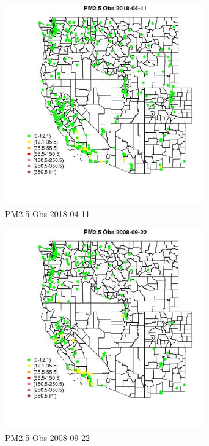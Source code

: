 \begin{figure} 
\centering  
\includegraphics[width=0.77\textwidth]{Code_Outputs/Report_ML_input_PM25_Step4_part_e_de_duplicated_aves_compiled_2019-05-18wNAs_MapObsPM25_Obs2018-04-11.jpg} 
\caption{\label{fig:Report_ML_input_PM25_Step4_part_e_de_duplicated_aves_compiled_2019-05-18wNAsMapObsPM25_Obs2018-04-11}PM2.5 Obs 2018-04-11} 
\end{figure} 
 

\begin{figure} 
\centering  
\includegraphics[width=0.77\textwidth]{Code_Outputs/Report_ML_input_PM25_Step4_part_e_de_duplicated_aves_compiled_2019-05-18wNAs_MapObsPM25_Obs2008-09-22.jpg} 
\caption{\label{fig:Report_ML_input_PM25_Step4_part_e_de_duplicated_aves_compiled_2019-05-18wNAsMapObsPM25_Obs2008-09-22}PM2.5 Obs 2008-09-22} 
\end{figure} 
 

